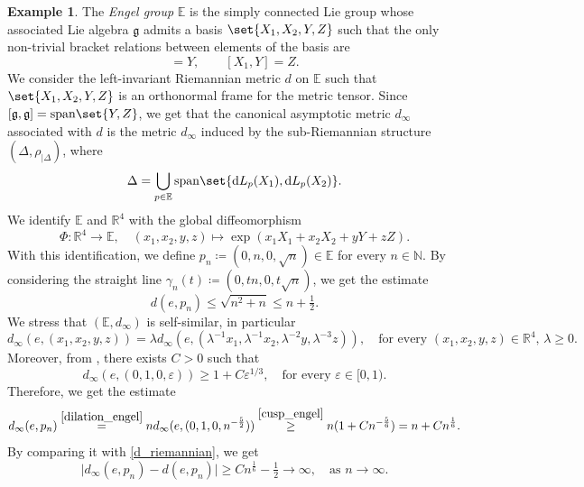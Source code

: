 \documentclass[a4paper,11pt,reqno]{amsart}
\theoremstyle{plain}
\theoremstyle{definition}
\newtheorem{example}[theorem]{Example}
\newcommand{\R}{\mathbb R}
\newcommand{\N}{\mathbb N}
\newcommand{\E}{\mathbb E}
\newcommand{\g}{\mathfrak{g}}
\newcommand{\spn}{\mathrm{span}}
\newcommand{\de}{\mathrm{d}}
\newcommand{\coloneq}{\coloneqq}
\begin{document}
 \begin{example}
 The \emph{Engel group} $\E$ is the simply connected Lie group whose associated Lie algebra $\g$ admits a basis $\set{X_1,X_2,Y,Z}$ such that the only non-trivial bracket relations between elements of the basis are
 \begin{equation*}
 [X_1,X_2]=Y, \qquad [X_1,Y]=Z.
 \end{equation*}
 We consider the left-invariant Riemannian metric $d$ on $\E$ such that $\set{X_1,X_2,Y,Z}$ is an orthonormal frame for the metric tensor. Since $[\g,\g]=\spn\set{Y,Z}$, we get that the canonical asymptotic metric $d_\infty$ associated with $d$ is the metric $d_\infty$ induced by the sub-Riemannian structure $(\Delta,\rho_{|\Delta})$, where
 \begin{equation*}
 \Delta = \bigcup_{p \in \E} \spn\set{\de L_p(X_1), \de L_p(X_2)}.
 \end{equation*}
 We identify $\E$ and $\R^4$ with the global diffeomorphism
 \begin{equation*}
 \Phi \colon \R^4 \to \E, \quad (x_1,x_2,y,z) \mapsto \exp(x_1X_1+x_2X_2+yY+zZ).
 \end{equation*}
 With this identification, we define $p_n \coloneq (0,n,0,\sqrt{n}) \in \E$ for every $n \in \N$. By considering the straight line $\gamma_n(t)\coloneq(0,tn,0,t\sqrt{n})$, we get the estimate
 \begin{equation} \label{d_riemannian}
 d(e,p_n) \le \sqrt{n^2 + n} \le n + \tfrac{1}{2}.
 \end{equation}
 We stress that $(\E,d_\infty)$ is self-similar, in particular
 \begin{equation} \label{dilation_engel}
 d_\infty(e,(x_1,x_2,y,z)) = \lambda d_\infty(e,(\lambda^{-1} x_1, \lambda^{-1} x_2, \lambda^{-2} y, \lambda^{-3} z)), \quad \text{for every $(x_1,x_2,y,z) \in \R^4, \, \lambda \ge 0$.}
 \end{equation}
 Moreover, from \cite[Lemma~4.1]{MR3906166}, there exists $C>0$ such that
 \begin{equation} \label{cusp_engel}
 d_\infty(e,(0,1,0,\varepsilon)) \ge 1 + C\varepsilon^{1/3}, \quad \text{for every $\varepsilon \in [0,1)$.}
 \end{equation}
 Therefore, we get the estimate
 \begin{equation*}
 d_\infty(e,p_n) \stackrel{\eqref{dilation_engel}}{=} n d_\infty(e,(0,1,0,n^{-\frac{5}{2}})) \stackrel{\eqref{cusp_engel}}{\ge} n (1 + Cn^{-\frac{5}{6}})
 = n + Cn^{\frac{1}{6}}.
 \end{equation*}
 By comparing it with \eqref{d_riemannian}, we get
 \begin{equation*}
 \lvert d_\infty(e,p_n)-d(e,p_n)\rvert \ge Cn^{\frac{1}{6}} - \tfrac{1}{2} \to \infty, \quad \text{as $n \to \infty$.}
 \end{equation*}

 \end{example}
\end{document}
